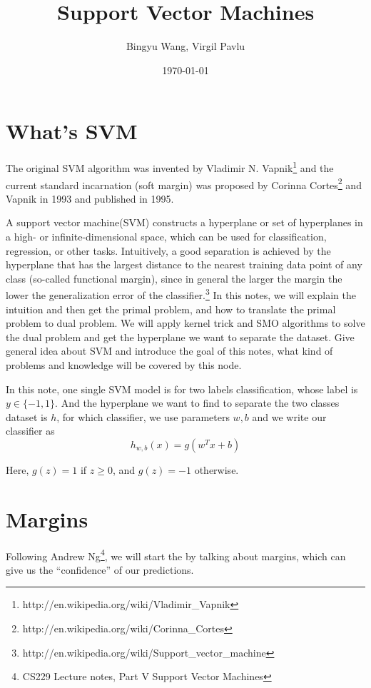 \documentclass[a4paper]{article}
\title{Support Vector Machines}
\author{Bingyu Wang, Virgil Pavlu}
\date{\today}
\begin{document}
\maketitle
\section{What's SVM}
The original SVM algorithm was invented by Vladimir N. Vapnik\footnote{http://en.wikipedia.org/wiki/Vladimir\_Vapnik} and the current standard incarnation (soft margin) was proposed by Corinna Cortes\footnote{http://en.wikipedia.org/wiki/Corinna\_Cortes} and Vapnik in 1993 and published in 1995.

A support vector machine(SVM) constructs a hyperplane or set of hyperplanes in a high- or infinite-dimensional space, which can be used for classification, regression, or other tasks. Intuitively, a good separation is achieved by the hyperplane that has the largest distance to the nearest training data point of any class (so-called functional margin), since in general the larger the margin the lower the generalization error of the classifier.\footnote{http://en.wikipedia.org/wiki/Support\_vector\_machine} In this notes, we will explain the intuition and then get the primal problem, and how to translate the primal problem to dual problem. We will apply kernel trick and SMO algorithms to solve the dual problem and get the hyperplane we want to separate the dataset.
Give general idea about SVM and introduce the goal of this notes, what kind of problems and knowledge will be covered by this node. 

In this note, one single SVM model is for two labels classification, whose label is $y \in \{-1, 1\}$. And the hyperplane we want to find to separate the two classes dataset is $h$, for which classifier, we use parameters $w, b$ and we write our classifier as
$$
h_{w,b}(x) = g(w^T x + b)
$$

Here, $g(z) = 1$ if $z \geq 0$, and $g(z) = -1$ otherwise. 

\section{Margins}

Following Andrew Ng\footnote{CS229 Lecture notes, Part V Support Vector Machines}, we will start the by talking about margins, which can give us the ``confidence'' of our predictions.
\end{document}
